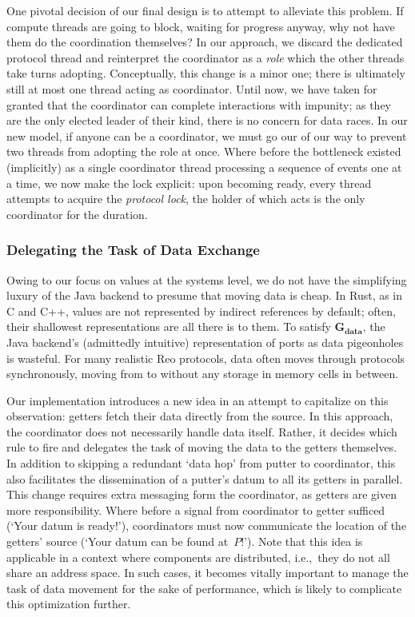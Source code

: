 One pivotal decision of our final design is to attempt to alleviate this problem. If compute threads are going to block, waiting for progress anyway, why not have them do the coordination themselves? In our approach, we discard the dedicated protocol thread and reinterpret the coordinator as a \textit{role} which the other threads take turns adopting. Conceptually, this change is a minor one; there is ultimately still at most one thread acting as coordinator. Until now, we have taken for granted that the coordinator can complete interactions with impunity; as they are the only elected leader of their kind, there is no concern for data races. In our new model, if anyone can be a coordinator, we must go our of our way to prevent two threads from adopting the role at once. Where before the bottleneck existed (implicitly) as a single coordinator thread processing a sequence of events one at a time, we now make the lock explicit: upon becoming ready, every thread attempts to acquire the \textit{protocol lock}, the holder of which acts is the only coordinator for the duration.

\subsubsection{Delegating the Task of Data Exchange}
Owing to our focus on values at the systems level, we do not have the simplifying luxury of the Java backend to presume that moving data is cheap. In Rust, as in C and C++, values are not represented by indirect references by default; often, their shallowest representations are all there is to them. To satisfy $\boldsymbol{G_{data}}$, the Java backend's (admittedly intuitive) representation of ports as data pigeonholes is wasteful. For many realistic Reo protocols, data often moves through protocols synchronously, moving from  to  without any storage in memory cells in between. 

Our implementation introduces a new idea in an attempt to capitalize on this observation: getters fetch their data directly from the source. In this approach, the coordinator does not necessarily handle data itself. Rather, it decides which rule to fire and delegates the task of moving the data to the getters themselves. In addition to skipping a redundant `data hop' from putter to coordinator, this also facilitates the dissemination of a putter's datum to all its getters in parallel. This change requires extra messaging form the coordinator, as getters are given more responsibility. Where before a signal from coordinator to getter sufficed (`Your datum is ready!'), coordinators must now communicate the location of the getters' source (`Your datum can be found at~$P$!'). Note that this idea is applicable in a context where components are distributed, i.e.,\ they do not all share an address space. In such cases, it becomes vitally important to manage the task of data movement for the sake of performance, which is likely to complicate this optimization further. 


